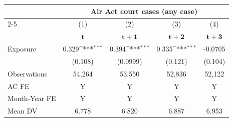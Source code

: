 {
\def\sym#1{\ifmmode^{#1}\else\(^{#1}\)\fi}
\begin{tabular}{l*{4}{c}}
\toprule
            &\multicolumn{4}{c}{\textbf{Air Act court cases (any case)}}\\\cmidrule(lr){2-5}
            &\multicolumn{1}{c}{(1)}&\multicolumn{1}{c}{(2)}&\multicolumn{1}{c}{(3)}&\multicolumn{1}{c}{(4)}\\
            &\multicolumn{1}{c}{$\boldsymbol{t}$}&\multicolumn{1}{c}{$\boldsymbol{t+1}$}&\multicolumn{1}{c}{$\boldsymbol{t+2}$}&\multicolumn{1}{c}{$\boldsymbol{t+3}$}\\
\midrule
Exposure    &0.329\sym{***}&0.394\sym{***}&0.335\sym{***}&-0.0705\\
            &(0.108)&(0.0999)&(0.121)&(0.104)\\
\midrule
Observations&54,264&53,550&52,836&52,122\\
AC FE       &Y&Y&Y&Y\\
Month-Year FE&Y&Y&Y&Y\\
Mean DV     &6.778&6.820&6.887&6.953\\
\bottomrule
\end{tabular}
}

